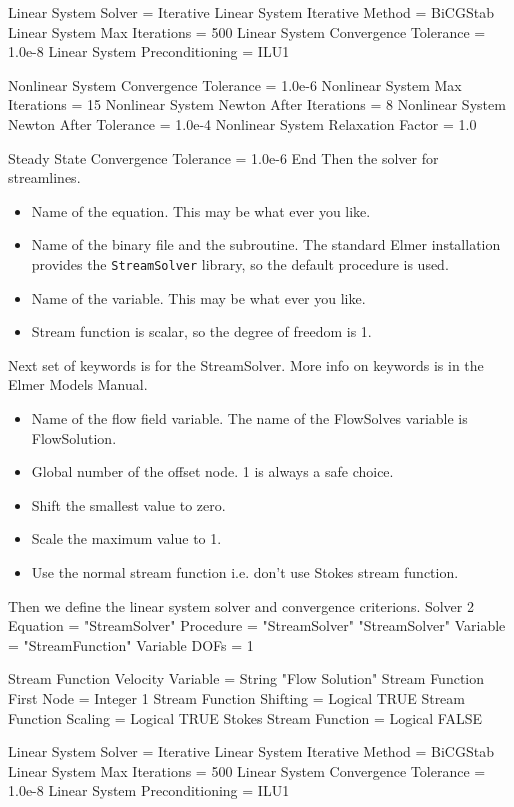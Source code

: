   Linear System Solver = Iterative
  Linear System Iterative Method = BiCGStab
  Linear System Max Iterations = 500
  Linear System Convergence Tolerance = 1.0e-8
  Linear System Preconditioning = ILU1

  Nonlinear System Convergence Tolerance = 1.0e-6
  Nonlinear System Max Iterations = 15
  Nonlinear System Newton After Iterations = 8
  Nonlinear System Newton After Tolerance = 1.0e-4
  Nonlinear System Relaxation Factor = 1.0

  Steady State Convergence Tolerance = 1.0e-6
End
\ttend
Then the solver for streamlines.
\begin{itemize}
\item Name of the equation. This may be what ever you like.
\item Name of the binary file and the subroutine. The standard Elmer
installation provides the \texttt{StreamSolver} library, so the default
procedure is used.
\item Name of the variable. This may be what ever you like.
\item Stream function is scalar, so the degree of freedom is 1.
\end{itemize}
Next set of keywords is for the StreamSolver. More info on keywords is in the Elmer
Models Manual.
\begin{itemize}
\item Name of the flow field variable. The name of the FlowSolves variable is FlowSolution.
\item Global number of the offset node. 1 is always a safe choice.
\item Shift the smallest value to zero.
\item Scale the maximum value to 1.
\item Use the normal stream function i.e. don't use Stokes stream function.
\end{itemize}
Then we define the linear system solver and convergence criterions.
\ttbegin
Solver 2
  Equation = "StreamSolver"
  Procedure = "StreamSolver" "StreamSolver"
  Variable = "StreamFunction"
  Variable DOFs = 1

  Stream Function Velocity Variable = String "Flow Solution"
  Stream Function First Node = Integer 1
  Stream Function Shifting = Logical TRUE
  Stream Function Scaling = Logical TRUE
  Stokes Stream Function = Logical FALSE

  Linear System Solver = Iterative
  Linear System Iterative Method = BiCGStab
  Linear System Max Iterations = 500
  Linear System Convergence Tolerance = 1.0e-8
  Linear System Preconditioning = ILU1

